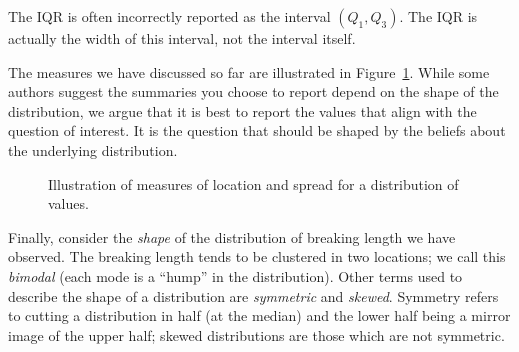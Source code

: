 \documentclass[
  letterpaper,
  DIV=11,
  numbers=noendperiod]{scrreprt}
\theoremstyle{definition}
\theoremstyle{definition}
\theoremstyle{plain}
\theoremstyle{remark}
\begin{document}
\begin{tcolorbox}[enhanced jigsaw, colbacktitle=quarto-callout-note-color!10!white, colback=white, left=2mm, title=\textcolor{quarto-callout-note-color}{\faInfo}\hspace{0.5em}{Note}, toptitle=1mm, leftrule=.75mm, breakable, bottomrule=.15mm, arc=.35mm, rightrule=.15mm, toprule=.15mm, coltitle=black, opacityback=0, colframe=quarto-callout-note-color-frame, opacitybacktitle=0.6, bottomtitle=1mm, titlerule=0mm]

The IQR is often incorrectly reported as the interval
\(\left(Q_1, Q_3\right)\). The IQR is actually the width of this
interval, not the interval itself.

\end{tcolorbox}

The measures we have discussed so far are illustrated in
Figure~\ref{fig-summaries-summaries}. While some authors suggest the
summaries you choose to report depend on the shape of the distribution,
we argue that it is best to report the values that align with the
question of interest. It is the question that should be shaped by the
beliefs about the underlying distribution.

\begin{figure}


\caption{\label{fig-summaries-summaries}Illustration of measures of
location and spread for a distribution of values.}

\end{figure}%

Finally, consider the \emph{shape} of the distribution of breaking
length we have observed. The breaking length tends to be clustered in
two locations; we call this \emph{bimodal} (each mode is a ``hump'' in
the distribution). Other terms used to describe the shape of a
distribution are \emph{symmetric} and \emph{skewed}. Symmetry refers to
cutting a distribution in half (at the median) and the lower half being
a mirror image of the upper half; skewed distributions are those which
are not symmetric.
\end{document}
